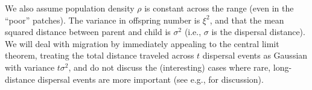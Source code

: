 \documentclass{article}
\newcommand{\linelabel}[1]{}
\newcommand{\citep}[1]{\cite{#1}}
\newcommand{\citet}[1]{\cite{#1}}
\newcommand{\gc}[1]{{\it\color{green}(#1)} }
\newcommand{\plr}[1]{{\it\color{blue}(#1)}}
\begin{document}
We also assume population density $\rho$ is constant across the range (even in the ``poor'' patches).
The variance in offspring number is $\xi^2$, 
and that the mean squared distance between parent and child is $\sigma^2$
(i.e., $\sigma$ is the dispersal distance). 
We will deal with migration by immediately appealing to the central limit theorem,
treating the total distance traveled across $t$  dispersal events as Gaussian with variance $t \sigma^2$,
and do not discuss the (interesting) cases where rare, long-distance dispersal events
are more important (see e.g., \citet{levin2003ecology,ralph2010parallel,hallatschek2014acceleration} for discussion).  \linelabel{rr:longtailed}
\end{document}
